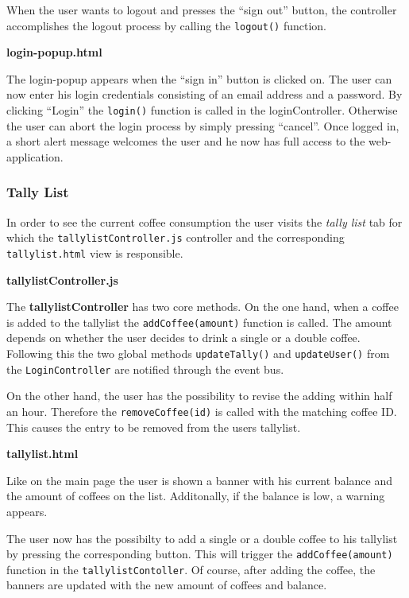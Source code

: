 When the user wants to logout and presses the ``sign out'' button, the
controller accomplishes the logout process by calling the
\texttt{logout()} function.

\textbf{login-popup.html}

The login-popup appears when the ``sign in'' button is clicked on. The
user can now enter his login credentials consisting of an email address
and a password. By clicking ``Login'' the \texttt{login()} function is
called in the loginController. Otherwise the user can abort the login
process by simply pressing ``cancel''. Once logged in, a short alert
message welcomes the user and he now has full access to the
web-application.

\subsubsection{Tally List}\label{tally-list}

In order to see the current coffee consumption the user visits the
\emph{tally list} tab for which the \texttt{tallylistController.js}
controller and the corresponding \texttt{tallylist.html} view is
responsible.

\textbf{tallylistController.js}

The \textbf{tallylistController} has two core methods. On the one hand,
when a coffee is added to the tallylist the \texttt{addCoffee(amount)}
function is called. The amount depends on whether the user decides to
drink a single or a double coffee. Following this the two global methods
\texttt{updateTally()} and \texttt{updateUser()} from the
\texttt{LoginController} are notified through the event bus.

On the other hand, the user has the possibility to revise the adding
within half an hour. Therefore the \texttt{removeCoffee(id)} is called
with the matching coffee ID. This causes the entry to be removed from
the users tallylist.

\textbf{tallylist.html}

Like on the main page the user is shown a banner with his current
balance and the amount of coffees on the list. Additonally, if the
balance is low, a warning appears.

The user now has the possibilty to add a single or a double coffee to
his tallylist by pressing the corresponding button. This will trigger
the \texttt{addCoffee(amount)} function in the
\texttt{tallylistContoller}. Of course, after adding the coffee, the
banners are updated with the new amount of coffees and balance.

